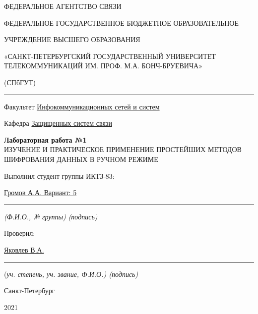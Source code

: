 \documentclass[a4paper,14pt]{extarticle}
\begin{document}
    \begin{center}
        \thispagestyle{empty}
        \begin{singlespace}
        ФЕДЕРАЛЬНОЕ АГЕНТСТВО СВЯЗИ

        ФЕДЕРАЛЬНОЕ ГОСУДАРСТВЕННОЕ БЮДЖЕТНОЕ ОБРАЗОВАТЕЛЬНОЕ

        УЧРЕЖДЕНИЕ ВЫСШЕГО ОБРАЗОВАНИЯ

        «САНКТ-ПЕТЕРБУРГСКИЙ ГОСУДАРСТВЕННЫЙ УНИВЕРСИТЕТ ТЕЛЕКОММУНИКАЦИЙ ИМ. ПРОФ. М.А. БОНЧ-БРУЕВИЧА»

        (СПбГУТ)
        \end{singlespace}
        \vspace{-1ex}
        \rule{\textwidth}{0.4pt}
        \vspace{-5ex}

        Факультет \underline{Инфокоммуникационных сетей и систем}

        Кафедра \underline{Защищенных систем связи}
        \vspace{10ex}

        \textbf{Лабораторная работа №1}\\
        ИЗУЧЕНИЕ И ПРАКТИЧЕСКОЕ ПРИМЕНЕНИЕ ПРОСТЕЙШИХ МЕТОДОВ ШИФРОВАНИЯ ДАННЫХ В РУЧНОМ РЕЖИМЕ


    \end{center}
    \vspace{4ex}
    \begin{flushright}
    \parbox{10 cm}{
    \begin{flushleft}
        Выполнил студент группы ИКТЗ-83:

        \underline{Громов А.А. Вариант: 5} \hfill \rule[-0.85ex]{0.1\textwidth}{0.6pt}

        \footnotesize \textit{ (Ф.И.О., № группы) \hfill (подпись)} \normalsize

        Проверил:

        \underline{Яковлев В.А.} \hfill \rule[-0.85ex]{0.1\textwidth}{0.6pt}

        (\footnotesize \textit{уч. степень, уч. звание, Ф.И.О.) \hfill (подпись)} \normalsize

    \end{flushleft}
    }
    \end{flushright}
    \begin{center}
        \vfill
        Санкт-Петербург

        2021

    \end{center}
    \newpage
\end{document}
